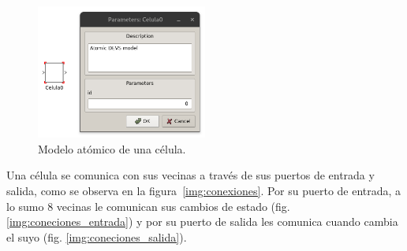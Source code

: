\documentclass[12pt]{article}
\begin{document}
\begin{figure}[ht]
  \centering
  \includegraphics[width=0.5\textwidth]{imagenes/celula.png}
  \caption{Modelo atómico de una célula.}\label{img:celula}
\end{figure}

Una célula se comunica con sus vecinas a través de sus puertos de entrada y salida, como se observa en la figura~\ref{img:conexiones}. Por su puerto de entrada, a lo sumo 8 vecinas le comunican sus cambios de estado (fig. \ref{img:coneciones_entrada}) y por su puerto de salida les comunica cuando cambia el suyo (fig. \ref{img:coneciones_salida}).
\end{document}
